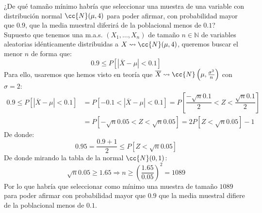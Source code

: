 \begin{ejercicio}
    ¿De qué tamaño mínimo habría que seleccionar una muestra de una variable con distribución normal $\cc{N}(\mu, 4)$ para poder afirmar, con probabilidad mayor que $0.9$, que la media muestral diferirá de la poblacional menos de $0.1$?\\

    \noindent
    Supuesto que tenemos una m.a.s. $(X_1, \ldots, X_n)$ de tamaño $n\in \mathbb{N}$ de variables aleatorias idénticamente distribuidas a $X\rightsquigarrow\cc{N}(\mu, 4)$, queremos buscar el menor $n$ de forma que:
    \begin{equation*}
        0.9 \leq P\left[|\overline{X}-\mu| < 0.1\right]
    \end{equation*}
    Para ello, usaremos que hemos visto en teoría que $\overline{X}\rightsquigarrow\cc{N}\left(\mu, \frac{\sigma^2}{n}\right)$ con $\sigma=2$:
    \begin{align*}
        0.9 \leq P[|\overline{X}-\mu| < 0.1] &= P[-0.1 < |\overline{X}-\mu| < 0.1] = P\left[\dfrac{-\sqrt{n}0.1}{2} < Z < \dfrac{\sqrt{n}0.1}{2}\right] \\ 
                                             &= P\left[-\sqrt{n}0.05 < Z<\sqrt{n}0.05\right] = 2P\left[Z<\sqrt{n}0.05\right] - 1 
    \end{align*}
    De donde:
    \begin{equation*}
        0.95 = \dfrac{0.9+1}{2} \leq P[Z<\sqrt{n}0.05]
    \end{equation*}
    De donde mirando la tabla de la normal $\cc{N}(0,1)$:
    \begin{equation*}
        \sqrt{n}0.05 \geq 1.65 \Longrightarrow n \geq {\left(\dfrac{1.65}{0.05}\right)}^{2} = 1089
    \end{equation*}
    Por lo que habría que seleccionar como mínimo una muestra de tamaño $1089$ para poder afirmar con probabilidad mayor que $0.9$ que la media muestral difiere de la poblacional menos de $0.1$.
\end{ejercicio}

